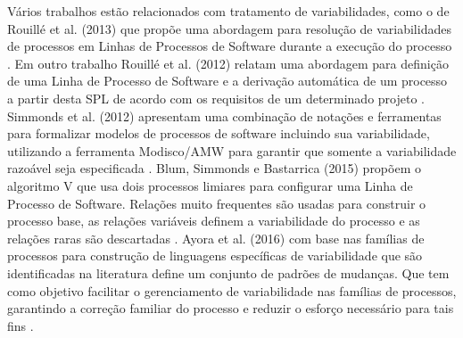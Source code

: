 Vários trabalhos estão relacionados com tratamento de variabilidades, como o de Rouillé et al. (2013) que propõe uma abordagem para resolução de variabilidades de processos em Linhas de Processos de Software durante a execução do processo \cite{14rouille:2013}. Em outro trabalho Rouillé et al. (2012) relatam uma abordagem para definição de uma Linha de Processo de Software e a derivação automática de um processo a partir desta SPL de acordo com os requisitos de um determinado projeto \cite{2rouille:2012}. Simmonds et al. (2012) apresentam uma combinação de notações e ferramentas para formalizar modelos de processos de software incluindo sua variabilidade, utilizando a ferramenta Modisco/AMW para garantir que somente a variabilidade razoável seja especificada \cite{12simmonds:2012}. Blum, Simmonds e Bastarrica (2015) propõem o algoritmo V que usa dois processos limiares para configurar uma Linha de Processo de Software. Relações muito frequentes são usadas para construir o processo base, as relações variáveis definem a variabilidade do processo e as relações raras são descartadas \cite{15blum:2015}. Ayora et al. (2016) com base nas famílias de processos para construção de linguagens específicas de variabilidade que são identificadas na literatura define um conjunto de padrões de mudanças. Que tem como objetivo facilitar o gerenciamento de variabilidade nas famílias de processos, garantindo a correção familiar do processo e reduzir o esforço necessário para tais fins \cite{19ayora:2016}.


